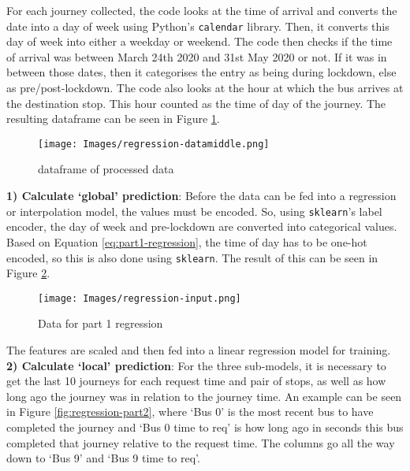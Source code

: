 For each journey collected, the code looks at the time of arrival and converts the date into a day of week using Python's \texttt{calendar} library. Then, it converts this day of week into either a weekday or weekend. The code then checks if the time of arrival was between March 24th 2020 and 31st May 2020 or not. If it was in between those dates, then it categorises the entry as being during lockdown, else as pre/post-lockdown. The code also looks at the hour at which the bus arrives at the destination stop. This hour counted as the time of day of the journey. The resulting dataframe can be seen in Figure \ref{fig:regression-datamiddle}.

\begin{figure}[H]
\begin{center}
    \texttt{[image: Images/regression-datamiddle.png]}
    \caption{dataframe of processed data}
    \label{fig:regression-datamiddle}
\end{center}
\end{figure}

\textbf{1) Calculate `global' prediction}: Before the data can be fed into a regression or interpolation model, the values must be encoded. So, using \texttt{sklearn}'s label encoder, the day of week and pre-lockdown are converted into categorical values. Based on Equation \ref{eq:part1-regression}, the time of day has to be one-hot encoded, so this is also done using \texttt{sklearn}. The result of this can be seen in Figure \ref{fig:regression-dataforregression}. 

\begin{figure}[H]
\begin{center}
    \texttt{[image: Images/regression-input.png]}
    \caption{Data for part 1 regression}
    \label{fig:regression-dataforregression}
\end{center}
\end{figure}

The features are scaled and then fed into a linear regression model for training. \\

\textbf{2) Calculate `local' prediction}: For the three sub-models, it is necessary to get the last 10 journeys for each request time and pair of stops, as well as how long ago the journey was in relation to the journey time. An example can be seen in Figure \ref{fig:regression-part2}, where `Bus 0' is the most recent bus to have completed the journey and `Bus 0 time to req' is how long ago in seconds this bus completed that journey relative to the request time. The columns go all the way down to `Bus 9' and `Bus 9 time to req'.

